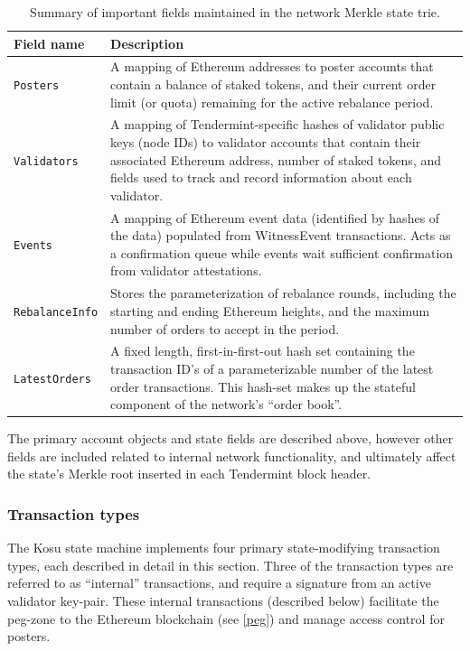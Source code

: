 \documentclass[10pt]{article}
\begin{document}
\bgroup
\def\arraystretch{1.2}
\begin{table}[H]
\centering
\label{table:table3}
\begin{tabularx}{1\textwidth}{|l|X|}
\hline
\textbf{Field name} & \textbf{Description} \\
\hline
\texttt{Posters} & A mapping of Ethereum addresses to poster accounts that contain a balance of staked tokens, and their current order limit (or quota) remaining for the active rebalance period. \\
\hline
\texttt{Validators} & A mapping of Tendermint-specific hashes of validator public keys (node IDs) to validator accounts that contain their associated Ethereum address, number of staked tokens, and fields used to track and record information about each validator. \\
\hline
\texttt{Events} & A mapping of Ethereum event data (identified by hashes of the data) populated from WitnessEvent transactions. Acts as a confirmation queue while events wait sufficient confirmation from validator attestations. \\
\hline
\texttt{RebalanceInfo} & Stores the parameterization of rebalance rounds, including the starting and ending Ethereum heights, and the maximum number of orders to accept in the period. \\
\hline
\texttt{LatestOrders} & A fixed length, first-in-first-out hash set containing the transaction ID’s of a parameterizable number of the latest order transactions. This hash-set makes up the stateful component of the network’s “order book”. \\
\hline
\end{tabularx}
\caption{Summary of important fields maintained in the network Merkle state trie.} 
\end{table}
\egroup

The primary account objects and state fields are described above, however other fields are included related to internal network functionality, and ultimately affect the state’s Merkle root inserted in each Tendermint block header.
\subsubsection{Transaction types}\label{tm-network-tx-types}
The Kosu state machine implements four primary state-modifying transaction types, each described in detail in this section. Three of the transaction types are referred to as “internal” transactions, and require a signature from an active validator key-pair. These internal transactions (described below) facilitate the peg-zone to the Ethereum blockchain (see \ref{peg}) and manage access control for posters. 
\medskip
\end{document}
